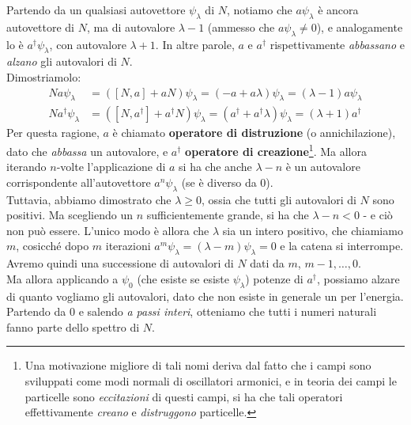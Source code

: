 \documentclass[../../FisicaTeorica.tex]{subfiles}
\begin{document}
Partendo da un qualsiasi autovettore $\psi_\lambda$ di $N$, notiamo che $a\psi_\lambda$ è ancora autovettore di $N$, ma di autovalore $\lambda-1$ (ammesso che $a\psi_\lambda \neq 0$), e analogamente lo è $a^\dag \psi_\lambda$, con autovalore $\lambda+1$. In altre parole, $a$ e $a^\dag$ rispettivamente \textit{abbassano} e \textit{alzano} gli autovalori di $N$.\\
Dimostriamolo:
\begin{align*}
N a\psi_\lambda&= ([N,a]+aN)\psi_\lambda = (-a +a\lambda) \psi_\lambda = (\lambda-1)a \psi_\lambda\\
N a^\dag \psi_\lambda &= ([N, a^\dag]+a^\dag N) \psi_\lambda = (a^\dag + a^\dag \lambda) \psi_\lambda = (\lambda+1) a^\dag
\end{align*} 
Per questa ragione, $a$ è chiamato \textbf{operatore di distruzione} (o annichilazione), dato che \textit{abbassa} un autovalore, e $a^\dag$ \textbf{operatore di creazione}\footnote{Una motivazione migliore di tali nomi deriva dal fatto che i campi sono sviluppati come modi normali di oscillatori armonici, e in teoria dei campi le particelle sono \textit{eccitazioni} di questi campi, si ha che tali operatori effettivamente \textit{creano} e \textit{distruggono} particelle.}.
Ma allora iterando $n$-volte l'applicazione di $a$ si ha che anche $\lambda-n$ è un autovalore corrispondente all'autovettore $a^n\psi_\lambda$ (se è diverso da $0$).\\
Tuttavia, abbiamo dimostrato che $\lambda \geq 0$, ossia che tutti gli autovalori di $N$ sono positivi. Ma scegliendo un $n$ sufficientemente grande, si ha che $\lambda-n < 0$ - e ciò non può essere. L'unico modo è allora che $\lambda$ sia un intero positivo, che chiamiamo $m$, cosicché dopo $m$ iterazioni $a^m\psi_\lambda = (\lambda-m)\psi_\lambda = 0$ e la catena si interrompe. Avremo quindi una successione di autovalori di $N$ dati da $m$, $m-1, \dots, 0$.\\
Ma allora applicando a $\psi_0$ (che esiste se esiste $\psi_\lambda$) potenze di $a^\dag$, possiamo alzare di quanto vogliamo gli autovalori, dato che non esiste in generale un  per l'energia. Partendo da $0$ e salendo \textit{a passi interi}, otteniamo che tutti i numeri naturali fanno parte dello spettro di $N$.\\
\end{document}
